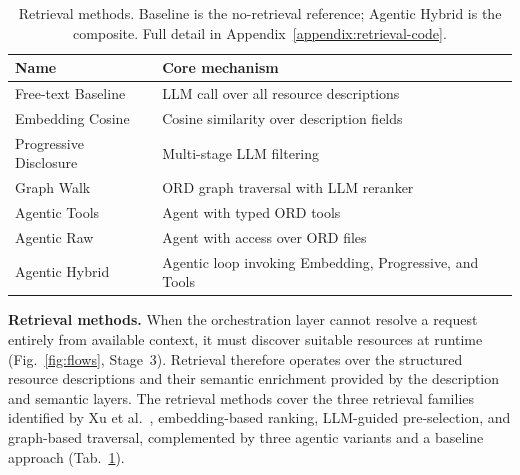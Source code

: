 \documentclass[10pt,twocolumn]{article}
\begin{document}
\begin{table}[t]
  \renewcommand{\arraystretch}{1.15}
  \caption{Retrieval methods. Baseline is the no-retrieval reference; Agentic Hybrid is the composite. Full detail in Appendix~\ref{appendix:retrieval-code}.}
  \label{tab:methods}
  \centering\small
  \setlength{\tabcolsep}{3pt}
  \begin{tabularx}{\columnwidth}{@{} l X @{}}
  \toprule
  \textbf{Name} & \textbf{Core mechanism} \\
  \midrule
  Free-text Baseline    & LLM call over all resource descriptions \\
  \midrule
  Embedding Cosine      & Cosine similarity over description fields \\
  Progressive Disclosure & Multi-stage LLM filtering \\
  Graph Walk            & ORD graph traversal with LLM reranker \\
  Agentic Tools         & Agent with typed ORD tools \\
  Agentic Raw           & Agent with access over ORD files \\
  Agentic Hybrid  & Agentic loop invoking Embedding, Progressive, and Tools \\
  \bottomrule
  \end{tabularx}
\end{table}

\textbf{Retrieval methods.} When the orchestration layer cannot resolve a request entirely from available context, it must discover suitable resources at runtime (Fig.~\ref{fig:flows}, Stage~3). Retrieval therefore operates over the structured resource descriptions and their semantic enrichment provided by the description and semantic layers. The retrieval methods cover the three retrieval families identified by Xu et al.\ \citep{xu_llm-based_2025}, embedding-based ranking, LLM-guided pre-selection, and graph-based traversal, complemented by three agentic variants and a baseline approach (Tab.~\ref{tab:methods}).
\end{document}

